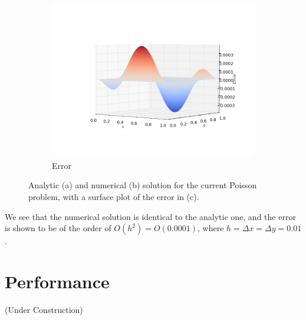 \documentclass[11pt]{report}
\begin{document}
\begin{figure}[h!]
\begin{subfigure}{0.6\textwidth}
  \includegraphics[width=1.0\linewidth]{images/example3_error}
  \caption{Error}
  \label{fig:sub3.3}
\end{subfigure}
\caption{Analytic (a) and numerical (b) solution for the current Poisson problem, with a surface plot of the  error in (c).}
\label{fig:example3}
\end{figure}

We see that the numerical solution is identical to the analytic one, and the error is shown to be of the order of $O(h^2) = O(0.0001)$, where $h = \Delta x = \Delta y = 0.01$. 

\chapter{Performance}
(Under Construction)
\end{document}

